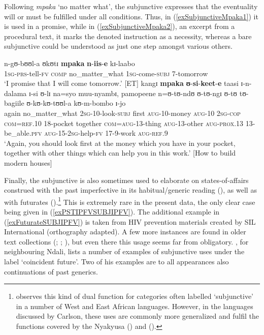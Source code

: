 Following \textit{mpaka} \lq no matter what', the subjunctive expresses that the eventuality will or must be fulfilled under all conditions. Thus, in (\ref{exSubjunctiveMpaka1}) it is used in a promise, while in (\ref{exSubjunctiveMpaka2}), an excerpt from a procedural text, it marks the denoted instruction as a necessity, whereas a bare subjunctive could be understood as just one step amongst various others.
\begin{exe}
\ex\label{exSubjunctiveMpaka1}
\gll n-gʊ-bʊʊl-a ʊkʊtɪ \textbf{mpaka} \textbf{n}-\textbf{iis}-\textbf{e} kɪ-laabo\\
1\textsc{sg}-\textsc{prs}-tell-\textsc{fv} \textsc{comp} no\_matter\_what 1\textsc{sg}-come-\textsc{subj} 7-tomorrow\\
\glt `I promise that I will come tomorrow.' [ET]
\ex\label{exSubjunctiveMpaka2} 
\gll kangɪ \textbf{mpaka} \textbf{ʊ}-\textbf{si}-\textbf{keet}-\textbf{e} taasi ɪ-n-dalama ɪ-si ʊ-lɪ na=syo muu-nyambɪ, pamopeene n=ʊ-tʊ-ndʊ ʊ-tʊ-ngɪ ʊ-tʊ tʊ-bagiile ʊ-kʊ-kʊ-tʊʊl-a kʊ-m-bombo ɪ-jo\\
again no\_matter\_what \textsc{2sg}-10-look-\textsc{subj} first \textsc{aug}-10-money \textsc{aug}-10 \textsc{2sg}-\textsc{cop} \textsc{com}=\textsc{ref}.10 18-pocket together \textsc{com}=\textsc{aug}-13-thing \textsc{aug}-13-other \textsc{aug}-\textsc{prox}.13 13-be\_able.\textsc{pfv} \textsc{aug}-15-\textsc{2sg}-help-\textsc{fv} 17-9-work \textsc{aug}-\textsc{ref}.9\\
\glt `Again, you should look first at the money which you have in your pocket, together with other things which can help you in this work.' [How to build modern houses]
\end{exe}

Finally, the subjunctive is also sometimes used to elaborate on states-of-affairs construed with the past imperfective in its habitual/generic reading (), as well as with futurates ().\footnote{\citet{CarlsonR1992} observes this kind of dual function for categories often labelled \lq subjunctive' in a number of West and East African languages. However, in the languages discussed by Carlson, these uses are commonly more generalized and fulfil the functions covered by the Nyakyusa  () and  ().} This is extremely rare in the present data, the only clear case being given in (\ref{exPSTIPFVSUBJIPFV}). The additional example in (\ref{exFuturateSUBJIPFV}) is taken from HIV prevention materials created by SIL International (orthography adapted). A few more instances are found in older text collections (\citealt{BergerP1933}; \citealt{BusseJ1942}; \citeyear{BusseJ1949}), but even there this usage seems far from obligatory.  \citet[130]{BotneR2008}, for neighbouring Ndali, lists a number of examples of subjunctive uses under the label \lq coincident future'. Two of his examples are to all appearances also continuations of past generics.

